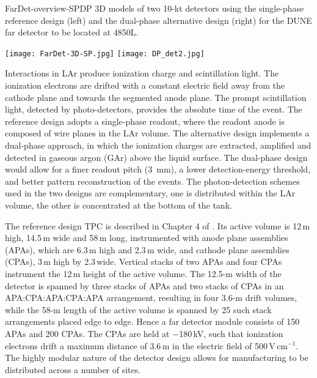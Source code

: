 \begin{cdrfigure}{FarDet-overview-SPDP}
{3D models of two 10-kt detectors using the single-phase reference design (left) 
and the dual-phase alternative design (right) for the DUNE far detector to be 
located at 4850L.}
\centering
\begin{minipage}[b]{1.0\textwidth}
\begin{center}
\texttt{[image: FarDet-3D-SP.jpg]}
\texttt{[image: DP\_det2.jpg]}
\end{center}
\end{minipage}
\end{cdrfigure}


Interactions in LAr produce ionization charge and scintillation light.
The ionization electrons are drifted with a constant electric field away from the cathode
plane and towards the segmented anode plane. 
The prompt scintillation light,
detected by photo-detectors, provides the absolute time of the event.
The reference design adopts a single-phase readout, where the readout anode is composed of wire planes in the LAr volume. 
The alternative design implements a  dual-phase approach, in which the 
ionization charges are extracted, amplified and detected in gaseous argon (GAr) above the liquid surface. 
The dual-phase design would allow for a finer readout pitch (3~mm), 
a lower detection-energy threshold, and better pattern reconstruction of the events.
The photon-detection schemes used in the two designs are complementary, one is distributed
within the LAr volume, the other is concentrated at the bottom of the tank.

The  reference design TPC is described in Chapter 4 of \voldune. 
Its active volume is 12\,m high, 14.5\,m wide and 
58\,m long, instrumented with anode plane assemblies (APAs), 
which are 6.3\,m high and 2.3\,m wide, and cathode plane assemblies (CPAs), 3\,m high by 2.3\,wide. 
Vertical stacks of
two APAs and four CPAs %
instrument the 12\,m height of the active volume. The 12.5-m width of the detector is 
spanned by three stacks of APAs and two stacks of CPAs in an APA:CPA:APA:CPA:APA
arrangement, resulting in four 3.6-m drift volumes, while the 58-m length of the active volume
is spanned by 25 such stack arrangements placed edge to edge. Hence a  
far detector module consists of 150 APAs and 200 CPAs. The CPAs are held at $-$180\,kV, such that 
ionization electrons drift a maximum distance of 3.6\,m in the electric field of 500\,V\,cm$^{-1}$.
The highly modular nature of the detector design allows for manufacturing to be distributed across a number of sites.

